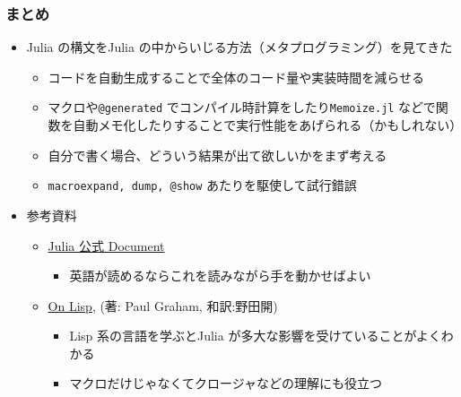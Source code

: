 \begin{frame}[containsverbatim]
\frametitle{まとめ}
\begin{itemize}
  \item Julia の構文をJulia の中からいじる方法（メタプログラミング）を見てきた
    \begin{itemize}
      \item コードを自動生成することで全体のコード量や実装時間を減らせる
      \item マクロや\verb|@generated| でコンパイル時計算をしたり\verb|Memoize.jl| などで関数を自動メモ化したりすることで実行性能をあげられる（かもしれない）
      \item 自分で書く場合、どういう結果が出て欲しいかをまず考える
      \item \verb|macroexpand, dump, @show| あたりを駆使して試行錯誤
    \end{itemize}
  \item 参考資料
  \begin{itemize}
    \item \href{http://docs.julialang.org/en/latest/manual/metaprogramming/}
      {Julia 公式 Document}
      \begin{itemize}
        \item 英語が読めるならこれを読みながら手を動かせばよい
      \end{itemize}
    \item \href{http://www.asahi-net.or.jp/~kc7k-nd/onlispjhtml/}
      {On Lisp}, (著: Paul Graham, 和訳:野田開)
      \begin{itemize}
        \item Lisp 系の言語を学ぶとJulia が多大な影響を受けていることがよくわかる
        \item マクロだけじゃなくてクロージャなどの理解にも役立つ
      \end{itemize}
  \end{itemize}
\end{itemize}
\end{frame}
